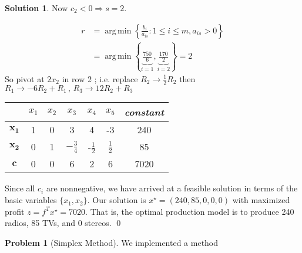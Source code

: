 \documentclass[11pt]{article}
\theoremstyle{plain}
\theoremstyle{definition}
\newtheorem{prob}{Problem}
\newtheorem*{soln*}{Solution}
\numberwithin{equation}{section}
\DeclareMathOperator*{\argmin}{arg\,min}
\begin{document}
\begin{soln*}
Now $c_2 < 0  \Rightarrow s = 2$.

\begin{align*}
    r &= \argmin \left\{ \frac{b_i}{a_{is}} : 1 \le i \le m , a_{is} > 0 \right\}\\
      &= \argmin \left\{ \underbrace{\frac{750}{6}}_{i=1} ,
\underbrace{\frac{170}{2}}_{i=2} \right\} = 2
\end{align*}
So pivot at $2x_2$ in row 2 ; i.e. replace $R_2 \to \frac{1}{2} R_2$ then
$R_1 \to -6R_2 + R_1 \,,\, R_3 \to 12R_2 + R_3 $

\begin{center}
\begin{tabu}{c|c|c|c|c|c|c}
    ~ & $x_1$ & $x_2$ & $x_3$ & $x_4$ & $x_5$ & \textit{constant} \\
    \hline
    $\bm{x_1}$ & 1 & 0 & 3 & 4 & -3 & 240 \\
    $\bm{x_2}$ & 0 & 1 & $-\frac{3}{4}$ & -$\frac{1}{2}$ & $\frac{1}{2}$ & 85 \\
    $\bm{c}$   & 0 & 0 & 6 & 2 & 6 & 7020
\end{tabu}
\end{center}
Since all $c_i$ are nonnegative, we have arrived at a feasible solution in terms of the basic variables
$\{x_1,x_2\}$. Our solution is $x^{\star} = (240, 85, 0, 0, 0)$ with maximized profit
$ z = f^T x^{\star} = 7020$. 
That is, the optimal production model is to produce 240 radios, 85 TVs, and 0 stereos.
\qed
\end{soln*}
\hrulefill %

\begin{prob}[Simplex Method]
    We implemented a method
\end{prob}
\end{document}
